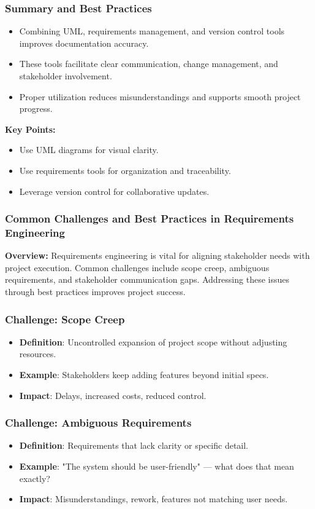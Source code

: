 \documentclass{beamer}
\begin{document}
\begin{frame}[fragile]
    \frametitle{Summary and Best Practices}
    \begin{itemize}
        \item Combining UML, requirements management, and version control tools improves documentation accuracy.
        \item These tools facilitate clear communication, change management, and stakeholder involvement.
        \item Proper utilization reduces misunderstandings and supports smooth project progress.
    \end{itemize}
    \vspace{0.5cm}
    \textbf{Key Points:}
    \begin{itemize}
        \item Use UML diagrams for visual clarity.
        \item Use requirements tools for organization and traceability.
        \item Leverage version control for collaborative updates.
    \end{itemize}
\end{frame}

\begin{frame}[fragile]
    \frametitle{Common Challenges and Best Practices in Requirements Engineering}
    \textbf{Overview:} Requirements engineering is vital for aligning stakeholder needs with project execution. Common challenges include scope creep, ambiguous requirements, and stakeholder communication gaps. Addressing these issues through best practices improves project success.
\end{frame}

\begin{frame}[fragile]
    \frametitle{Challenge: Scope Creep}
    \begin{itemize}
        \item \textbf{Definition}: Uncontrolled expansion of project scope without adjusting resources.
        \item \textbf{Example}: Stakeholders keep adding features beyond initial specs.
        \item \textbf{Impact}: Delays, increased costs, reduced control.
    \end{itemize}
\end{frame}

\begin{frame}[fragile]
    \frametitle{Challenge: Ambiguous Requirements}
    \begin{itemize}
        \item \textbf{Definition}: Requirements that lack clarity or specific detail.
        \item \textbf{Example}: "The system should be user-friendly" — what does that mean exactly?
        \item \textbf{Impact}: Misunderstandings, rework, features not matching user needs.
    \end{itemize}
\end{frame}
\end{document}
